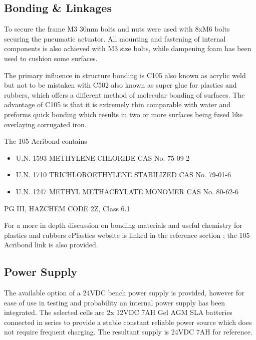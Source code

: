 \documentclass[a4paper, 10pt]{IEEEconf}
\begin{document}

\subsection{Bonding \& Linkages}

To secure the frame M3 30mm bolts and nuts were used with 8xM6 bolts securing the pneumatic actuator. All mounting and fastening of internal components is also achieved with M3 size bolts, while dampening foam has been used to cushion some surfaces.

The primary influence in structure bonding is C105 also known as acrylic weld but not to be mistaken with C502 also known as super glue for plastics and rubbers, which offers a different method of molecular bonding of surfaces. The advantage of C105 is that it is extremely thin comparable with water and preforms quick bonding which results in two or more surfaces being fused like overlaying corrugated iron.

The 105 Acribond contains
\begin{itemize}
	\item U.N. 1593 METHYLENE CHLORIDE CAS No. 75-09-2
	\item U.N. 1710 TRICHLOROETHYLENE STABILIZED CAS No. 79-01-6
	\item U.N. 1247 METHYL METHACRYLATE MONOMER CAS No. 80-62-6
\end{itemize}
PG III, HAZCHEM CODE 2Z, Class 6.1

For a more in depth discussion on bonding materials and useful chemistry for plastics and rubbers ePlastics website is linked in the reference section \cite{ePlastic}; the 105 Acribond link \cite{105} is also provided.


\subsection{Power Supply}

The available option of a 24VDC bench power supply is provided, however for ease of use in testing and probability an internal power supply has been integrated. The selected cells are 2x 12VDC 7AH Gel AGM SLA batteries connected in series to provide a stable constant reliable power source which does not require frequent charging. The resultant supply is 24VDC 7AH for reference. 
\end{document}
